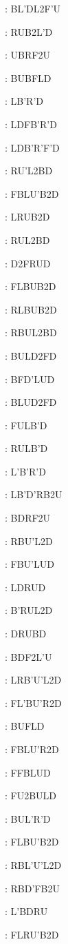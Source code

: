 \documentclass[9pt]{article}
\begin{document}
{\begin{multicols}{6}
: BL'DL2F'U

: RUB2L'D

: UBRF2U

: BUBFLD

: LB'R'D

: LDFB'R'D

: LDB'R'F'D

: RU'L2BD

: FBLU'B2D

: LRUB2D

: RUL2BD

: D2FRUD

: FLBUB2D

: RLBUB2D

: RBUL2BD

: BULD2FD

: BFD'LUD

: BLUD2FD

: FULB'D

: RULB'D

: L'B'R'D

: LB'D'RB2U

: BDRF2U

: RBU'L2D

: FBU'LUD

: LDRUD

: B'RUL2D

: DRUBD

: BDF2L'U

: LRB'U'L2D

: FL'BU'R2D

: BUFLD

: FBLU'R2D

: FFBLUD

: FU2BULD

: BUL'R'D

: FLBU'B2D

: RBL'U'L2D

: RBD'FB2U

: L'BDRU

: FLRU'B2D


\end{multicols}}
\end{document}
